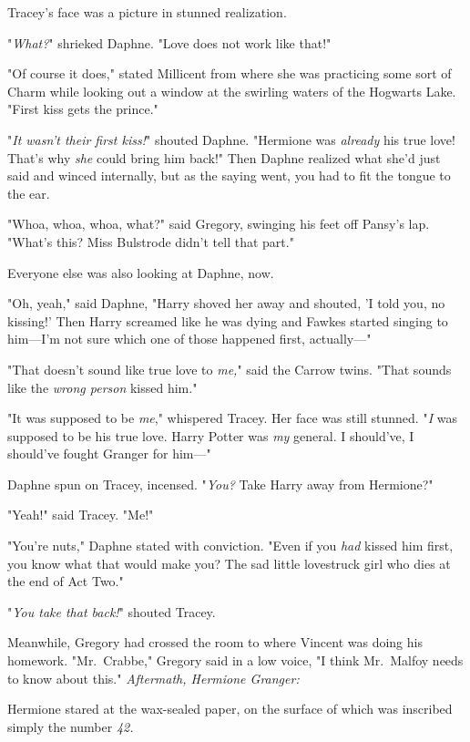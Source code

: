 Tracey's face was a picture in stunned realization.

"\emph{What?}" shrieked Daphne. "Love does not work like that!"

"Of course it does," stated Millicent from where she was practicing some sort 
of Charm while looking out a window at the swirling waters of the Hogwarts 
Lake. "First kiss gets the prince."

"\emph{It wasn't their first kiss!}" shouted Daphne. "Hermione was 
\emph{already} his true love! That's why \emph{she} could bring him back!" Then 
Daphne realized what she'd just said and winced internally, but as the saying 
went, you had to fit the tongue to the ear.

"Whoa, whoa, whoa, what?" said Gregory, swinging his feet off Pansy's lap. 
"What's this? Miss Bulstrode didn't tell that part."

Everyone else was also looking at Daphne, now.

"Oh, yeah," said Daphne, "Harry shoved her away and shouted, 'I told you, no 
kissing!' Then Harry screamed like he was dying and Fawkes started singing to 
him---I'm not sure which one of those happened first, actually---"

"That doesn't sound like true love to \emph{me,}" said the Carrow twins. "That 
sounds like the \emph{wrong person} kissed him."

"It was supposed to be \emph{me}," whispered Tracey. Her face was still 
stunned. "\emph{I} was supposed to be his true love. Harry Potter was \emph{my} 
general. I should've, I should've fought Granger for him---"

Daphne spun on Tracey, incensed. "\emph{You?} Take Harry away from Hermione?"

"Yeah!" said Tracey. "Me!"

"You're nuts," Daphne stated with conviction. "Even if you \emph{had} kissed 
him first, you know what that would make you? The sad little lovestruck girl 
who dies at the end of Act Two."

"\emph{You take that back!}" shouted Tracey.

Meanwhile, Gregory had crossed the room to where Vincent was doing his 
homework. "Mr.~Crabbe," Gregory said in a low voice, "I think Mr.~Malfoy needs 
to know about this."
\sbreak
\emph{Aftermath, Hermione Granger:}

Hermione stared at the wax-sealed paper, on the surface of which was inscribed 
simply the number \emph{42.}

